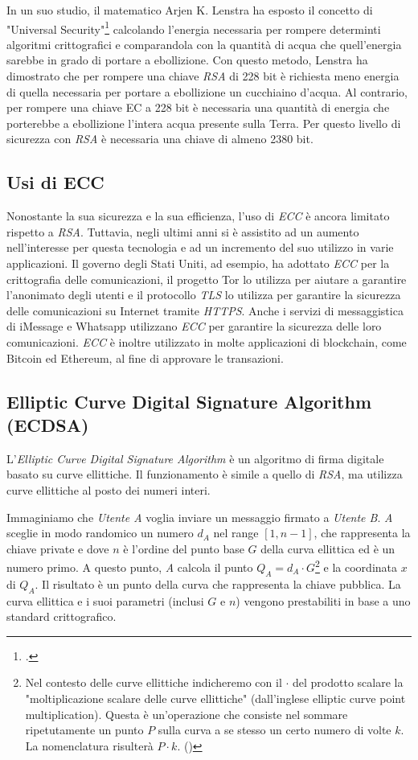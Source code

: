 In un suo studio, il matematico Arjen K. Lenstra ha esposto il concetto di "Universal Security"\footcite{site:universal-security} calcolando l'energia necessaria per rompere determinti algoritmi crittografici e comparandola con la quantità di acqua che quell'energia sarebbe in grado di portare a ebollizione.
Con questo metodo, Lenstra ha dimostrato che per rompere una chiave \emph{RSA} di 228 bit è richiesta meno energia di quella necessaria per portare a ebollizione un cucchiaino d'acqua.
Al contrario, per rompere una chiave EC a 228 bit è necessaria una quantità di energia che porterebbe a ebollizione l'intera acqua presente sulla Terra.
Per questo livello di sicurezza con \emph{RSA} è necessaria una chiave di almeno 2380 bit.

\subsection{Usi di ECC}
Nonostante la sua sicurezza e la sua efficienza, l'uso di \emph{ECC} è ancora limitato rispetto a \emph{RSA}.
Tuttavia, negli ultimi anni si è assistito ad un aumento nell'interesse per questa tecnologia e ad un incremento del suo utilizzo in varie applicazioni.
Il governo degli Stati Uniti, ad esempio, ha adottato \emph{ECC} per la crittografia delle comunicazioni, il progetto Tor lo utilizza per aiutare a garantire l'anonimato degli utenti e il protocollo \emph{\gls{TLS}} lo utilizza per garantire la sicurezza delle comunicazioni su Internet tramite \emph{\gls{HTTPS}}.
Anche i servizi di messaggistica di iMessage e Whatsapp utilizzano \emph{ECC} per garantire la sicurezza delle loro comunicazioni.
\emph{ECC} è inoltre utilizzato in molte applicazioni di blockchain, come Bitcoin ed Ethereum, al fine di approvare le transazioni.

\subsection{Elliptic Curve Digital Signature Algorithm (ECDSA)}
\label{sec:ecdsa}

L'\emph{Elliptic Curve Digital Signature Algorithm} è un algoritmo di firma digitale basato su curve ellittiche.
Il funzionamento è simile a quello di \emph{RSA}, ma utilizza curve ellittiche al posto dei numeri interi.

Immaginiamo che \emph{Utente A} voglia inviare un messaggio firmato a \emph{Utente B}.
\emph{A} sceglie in modo randomico un numero $d_A$ nel range $[1, n-1]$, che rappresenta la chiave private e dove $n$ è l'ordine del punto base $G$ della curva ellittica ed è un numero primo.
A questo punto, \emph{A} calcola il punto $Q_A = d_A \cdot G$\footnote{Nel contesto delle curve ellittiche indicheremo con il $\cdot$ del prodotto scalare la "moltiplicazione scalare delle curve ellittiche" (dall'inglese elliptic curve point multiplication). Questa è un'operazione che consiste nel sommare ripetutamente un punto $P$ sulla curva a se stesso un certo numero di volte $k$. La nomenclatura risulterà $P \cdot k$. (\cite{site:ec-point-multiplication})} e la coordinata $x$ di $Q_A$. Il risultato è un punto della curva che rappresenta la chiave pubblica.
La curva ellittica e i suoi parametri (inclusi $G$ e $n$) vengono prestabiliti in base a uno standard crittografico.

